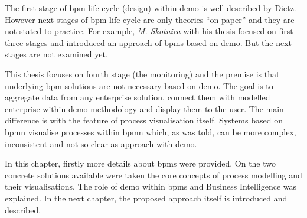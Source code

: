The first stage of \gls{bpm} life-cycle (design) within \gls{demo} is well described by Dietz\cite{dietz-essence-2015}\cite{dietz-enterprise-2006}. However next stages of \gls{bpm} life-cycle are only theories ``on paper'' and they are not stated to practice. For example, \textit{M. Skotnica}\cite{diploma-skotnica-2016} with his thesis focused on first three stages and introduced an approach of \gls{bpms} based on \gls{demo}. But the next stages are not examined yet.

This thesis focuses on fourth stage (the monitoring) and the premise is that underlying \gls{bpm} solutions are not necessary based on \gls{demo}. The goal is to aggregate data from any enterprise solution, connect them with modelled enterprise within \gls{demo} methodology and display them to the user. The main difference is with the feature of process visualisation itself. Systems based on \gls{bpmn} visualise processes within \gls{bpmn} which, as was told, can be more complex, inconsistent and not so clear as approach with \gls{demo}. 

In this chapter, firstly more details about \gls{bpms} were provided. On the two concrete solutions available were taken the core concepts of process modelling and their visualisations. The role of \gls{demo} within \gls{bpms} and Business Intelligence was explained. In the next chapter, the proposed approach itself is introduced and described.


